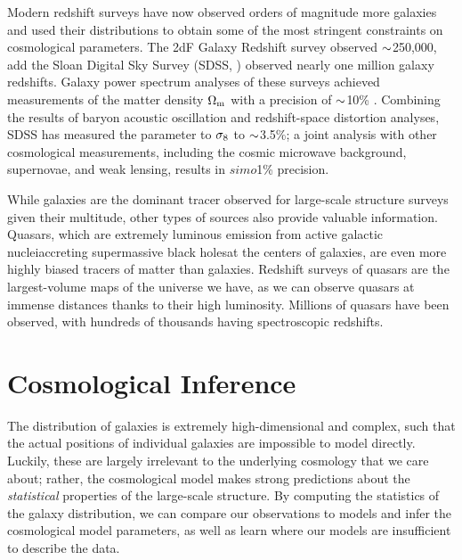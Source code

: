 Modern redshift surveys have now observed orders of magnitude more galaxies and used their distributions to obtain some of the most stringent constraints on cosmological parameters.
The 2dF Galaxy Redshift survey \citep{Colless2001} observed $\mathord{\sim}$250,000, add the Sloan Digital Sky Survey (SDSS, \citealt{York2000}) observed nearly one million galaxy redshifts.
Galaxy power spectrum analyses of these surveys achieved measurements of the matter density ${\Omega_\mathrm{m}}$ with a precision of $\mathord{\sim}$10\% \citep{cole_2df_2005, tegmark_cosmological_2006}.
Combining the results of baryon acoustic oscillation and redshift-space distortion analyses, SDSS has measured the parameter to $\sigma_\mathrm{8}$ to $\mathord{\sim}$3.5\%; a joint analysis with other cosmological measurements, including the cosmic microwave background, supernovae, and weak lensing, results in $simo$1\% precision.

While galaxies are the dominant tracer observed for large-scale structure surveys given their multitude, other types of sources also provide valuable information.
Quasars, which are extremely luminous emission from active galactic nuclei{\emdash}accreting supermassive black holes{\emdash}at the centers of galaxies, are even more highly biased tracers of matter than galaxies.
Redshift surveys of quasars are the largest-volume maps of the universe we have, as we can observe quasars at immense distances thanks to their high luminosity.
Millions of quasars have been observed, with hundreds of thousands having spectroscopic redshifts.



\section{Cosmological Inference}

The distribution of galaxies is extremely high-dimensional and complex, such that the actual positions of individual galaxies are impossible to model directly.
Luckily, these are largely irrelevant to the underlying cosmology that we care about; rather, the cosmological model makes strong predictions about the \emph{statistical} properties of the large-scale structure.
By computing the statistics of the galaxy distribution, we can compare our observations to models and infer the cosmological model parameters, as well as learn where our models are insufficient to describe the data.

